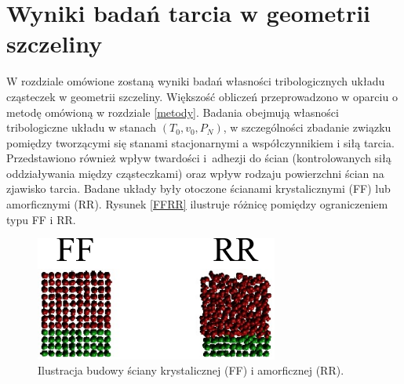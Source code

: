 \documentclass[12pt,a4paper,openright]{report} %
\begin{document}
\chapter{Wyniki badań tarcia w geometrii szczeliny}
\label{wyniki}
%
W rozdziale omówione zostaną wyniki badań własności tribologicznych układu cząsteczek w geometrii szczeliny. Większość obliczeń przeprowadzono w oparciu o metodę omówioną w rozdziale \ref{metody}. Badania obejmują własności tribologiczne układu w stanach $(T_0, v_0, P_N)$, w szczególności zbadanie związku pomiędzy tworzącymi się stanami stacjonarnymi a współczynnikiem i siłą tarcia. Przedstawiono również wpływ twardości i~adhezji do ścian (kontrolowanych siłą oddziaływania między cząsteczkami) oraz wpływ rodzaju powierzchni ścian na zjawisko tarcia. Badane układy były otoczone ścianami krystalicznymi (FF) lub amorficznymi (RR). Rysunek \ref{FFRR} ilustruje różnicę pomiędzy ograniczeniem typu FF i RR.
\begin{figure}[h]
\centering
\includegraphics[width=80mm]{rysunki/FFRR.pdf}
\caption{Ilustracja budowy ściany krystalicznej (FF) i amorficznej (RR).}
\label{FFRR}
\label{mapa_stanow}
\end{figure}
%
\end{document}
